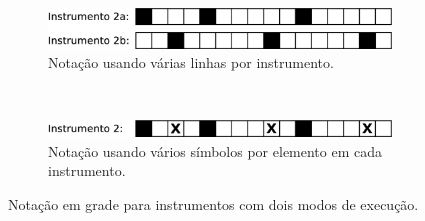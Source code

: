 \begin{figure}[h]
    \centering 
\begin{subfigure}[c]{0.7\textwidth}
\includegraphics[width=\textwidth]{chapters/cap-musica-basica/gridnotation2a.eps}
\caption{Notação usando várias linhas por instrumento.}
\label{fig:gridnotation2a}
\end{subfigure}
~%
\begin{subfigure}[c]{0.7\textwidth}
\includegraphics[width=\textwidth]{chapters/cap-musica-basica/gridnotation2b.eps}
\caption{Notação usando vários símbolos por elemento em cada instrumento.}
\label{fig:gridnotation2b}
\end{subfigure}
    \caption{Notação em grade para instrumentos com dois modos de execução.}\label{fig:gridnotation2}
\end{figure}

